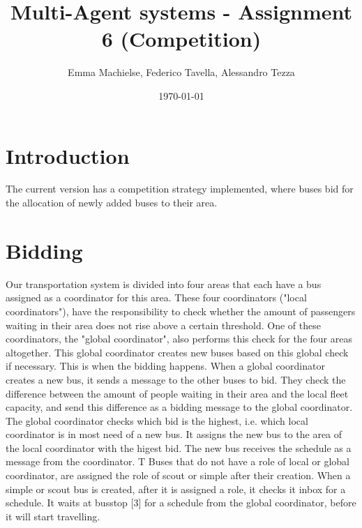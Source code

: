 \documentclass[a4paper]{article}
\title{Multi-Agent systems - Assignment 6 (Competition)}
\author{Emma Machielse, Federico Tavella, Alessandro Tezza}
\date{\today}
\begin{document}
\maketitle

\section{Introduction}
The current version has a competition strategy implemented, where buses bid for the allocation of newly added buses to their area.

\section{Bidding} 

Our transportation system is divided into four areas that each have a bus assigned as a coordinator for this area. These four coordinators ("local coordinators"), have the responsibility to check whether the amount of passengers waiting in their area does not rise above a certain threshold. One of these coordinators, the "global coordinator", also performs this check for the four areas altogether. This global coordinator creates new buses based on this global check if necessary. 
\newline
This is when the bidding happens. When a global coordinator creates a new bus, it sends a message to the other buses to bid. They check the difference between the amount of people waiting in their area and the local fleet capacity, and send this difference as a bidding message to the global coordinator. The global coordinator checks which bid is the highest, i.e. which local coordinator is in most need of a new bus. It assigns the new bus to the area of the local coordinator with the higest bid. The new bus receives the schedule as a message from the coordinator. T
\newline
Buses that do not have a role of local or global coordinator, are assigned the role of scout or simple after their creation. When a simple or scout bus is created, after it is assigned a role, it checks it inbox for a schedule. It waits at busstop [3] for a schedule from the global coordinator, before it will start travelling. 
\end{document}

